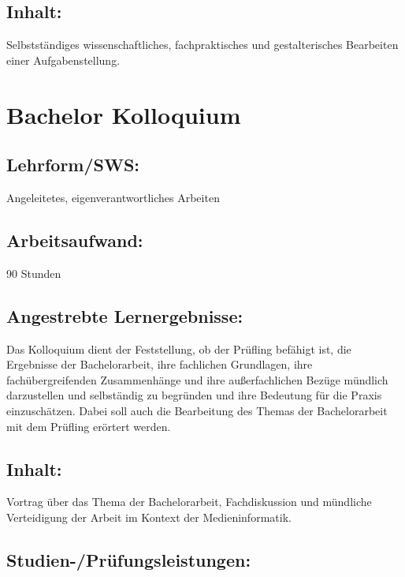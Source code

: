 \section*{Inhalt:}\label{inhalt-3}

Selbstständiges wissenschaftliches, fachpraktisches und gestalterisches
Bearbeiten einer Aufgabenstellung.

\chapter{Bachelor Kolloquium}\label{bachelor-kolloquium}

\section*{Lehrform/SWS:}\label{lehrformsws-2}

Angeleitetes, eigenverantwortliches Arbeiten

\section*{Arbeitsaufwand:}\label{arbeitsaufwand-2}

90 Stunden

\section*{Angestrebte
Lernergebnisse:}\label{angestrebte-lernergebnisse-4}

Das Kolloquium dient der Feststellung, ob der Prüfling befähigt ist, die
Ergebnisse der Bachelorarbeit, ihre fachlichen Grundlagen, ihre
fachübergreifenden Zusammenhänge und ihre außerfachlichen Bezüge
mündlich darzustellen und selbständig zu begründen und ihre Bedeutung
für die Praxis einzuschätzen. Dabei soll auch die Bearbeitung des Themas
der Bachelorarbeit mit dem Prüfling erörtert werden.

\section*{Inhalt:}\label{inhalt-4}

Vortrag über das Thema der Bachelorarbeit, Fachdiskussion und mündliche
Verteidigung der Arbeit im Kontext der Medieninformatik.

\section*{Studien-/Prüfungsleistungen:}\label{studien-pruxfcfungsleistungen-1}

